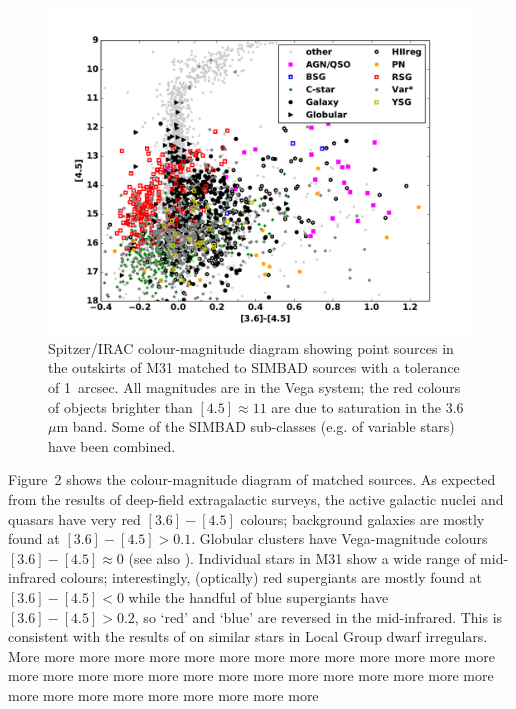\documentclass{iau}
\begin{document}
\begin{figure}[t]
\begin{center}
 \includegraphics[width=4.5in]{barmby_iaus321_fig2} 
 \caption{Spitzer/IRAC colour-magnitude diagram showing point sources in the outskirts of M31 matched to SIMBAD
 sources with a tolerance of 1~arcsec. All magnitudes are in the Vega system; the red colours of objects brighter than
 $[4.5]\approx 11$ are due to saturation in the 3.6~$\mu$m band. Some of the SIMBAD sub-classes (e.g. of variable stars)
have been combined.}
   \label{fig2}
\end{center}
\end{figure}

Figure~2 shows the colour-magnitude diagram of matched sources. As expected from the results of deep-field extragalactic surveys,
the active galactic nuclei and quasars have very red $[3.6]-[4.5]$ colours; background galaxies are mostly found at $[3.6]-[4.5]>0.1$.
Globular clusters have Vega-magnitude colours  $[3.6]-[4.5]\approx 0$ (see also \cite[Barmby \& Jalilian 2012)]{bj12}).
Individual stars in M31 show a wide range of mid-infrared colours; interestingly, (optically) red supergiants are mostly found at $[3.6]-[4.5]<0$
while the handful of blue supergiants have $[3.6]-[4.5]>0.2$, so `red' and `blue' are reversed in the mid-infrared.
This is consistent with the results of \cite[Britavskiy \etal\ (2015)]{brit15} on similar stars in Local Group dwarf irregulars.
More more more more more more more more more more more more more more more more more more more
 more more more more more more more more more more more more more more more more more more
 
\end{document}
